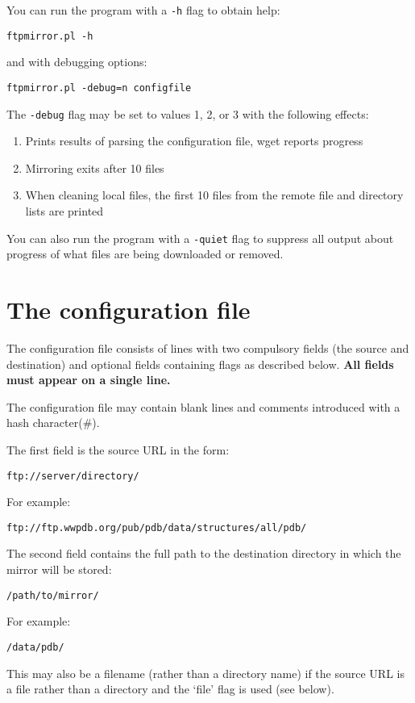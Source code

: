 \documentclass{article}
\begin{document}
You can run the program with a \verb|-h| flag to obtain help:
\begin{verbatim}
ftpmirror.pl -h
\end{verbatim}
and with debugging options:
\begin{verbatim}
ftpmirror.pl -debug=n configfile
\end{verbatim}
The \verb|-debug| flag may be set to values 1, 2, or 3 with the
following effects:
\begin{enumerate}
\item Prints results of parsing the configuration file, wget reports
  progress 
\item Mirroring exits after 10 files
\item When cleaning local files, the first 10 files from the remote
  file and directory lists are printed
\end{enumerate}
\vspace{2em}

You can also run the program with a \verb|-quiet| flag to suppress all
output about progress of what files are being downloaded or removed.

\section{The configuration file}
The configuration file consists of lines with two compulsory fields
(the source and destination) and optional fields containing flags as
described below. {\bfseries All fields must appear on a single line.}

The configuration file may contain blank lines and comments introduced
with a hash character(\#).
\vspace{2em}

The first field is the source URL in the form:
\begin{verbatim}
ftp://server/directory/
\end{verbatim}
For example:
\begin{verbatim}
ftp://ftp.wwpdb.org/pub/pdb/data/structures/all/pdb/
\end{verbatim}

The second field contains the full path to the destination directory
in which the mirror will be stored:
\begin{verbatim}
/path/to/mirror/
\end{verbatim}
For example:
\begin{verbatim}
/data/pdb/
\end{verbatim}
This may also be a filename (rather than a directory name) if the
source URL is a file rather than a directory and the `file' flag is
used (see below).
\end{document}
